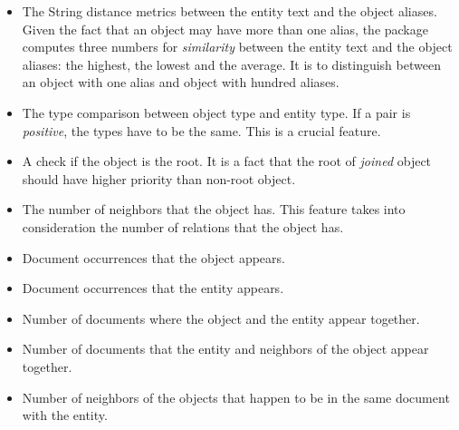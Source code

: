 \begin{itemize}
\item The String distance metrics between the entity text and the object
aliases. Given the fact that an object may have more than one alias, the package
computes three numbers for \textit{similarity} between the entity text and the
object aliases: the highest, the lowest and the average. It is to distinguish
between an object with one alias and object with hundred aliases.
\item The type comparison between object type and entity type. If a pair is
\textit{positive}, the types have to be the same. This is a crucial feature. 
\item A check if the object is the root. It is a fact that the root of
\textit{joined} object should have higher priority than non-root object.
\item The number of neighbors that the object has. This feature takes into
consideration the number of relations that the object has.
\item Document occurrences that the object appears. 
\item Document occurrences that the entity appears. 
\item Number of documents where the object and the entity appear together.
\item Number of documents that the entity and neighbors of the object appear together.
\item Number of neighbors of the objects that happen to be in the same document with the entity.
\end{itemize}


